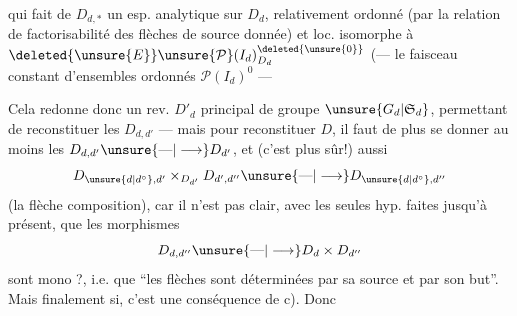 qui fait de $D_{d,*}$ un esp. analytique sur $D_d$,  relativement ordonné (par la relation de factorisabilité
\diagram{\begin{tikzcd}[ampersand replacement=\&, column sep=small,row sep=small]
{} \& {} \arrow[dd,dotted] \\
\bullet \arrow[ru] \arrow[rd] \& \\
{} \& {}
\end{tikzcd}}
des flèches de source donnée) et loc. isomorphe à $\deleted{\unsure{E}}\unsure{\mathcal P}(I_d)^{\deleted{\unsure{0}}}_{D_d}$  (--- le faisceau constant d'ensembles ordonnés  $\mathcal P(I_d)^0$ ---

Cela redonne donc un rev. $D'_d$ principal de groupe $\unsure{G_d|\mathfrak S_d}$, permettant de reconstituer les $D_{d,d'}$ --- mais pour reconstituer $D$, il faut de plus se donner  au moins les $D_{d,d'}\unsure{\text{---}|\longrightarrow}D_{d'}$, et (c'est plus sûr!) aussi
\[
D_{\unsure{d|d^\circ},d'}\mathbin{\times}_{D_{d'}}D_{d',d''}\unsure{\text{---}|\longrightarrow}D_{\unsure{d|d^\circ},d''}
\]
(la flèche composition), car il n'est pas clair, avec les seules hyp. faites jusqu'à présent, que les morphismes
\[
D_{d,d''}\unsure{\text{---}|\longrightarrow}D_d\times D_{d''}
\]
sont mono ?, i.e. que ``les flèches sont déterminées par sa source et par son but''. Mais finalement si, c'est une conséquence de c). Donc
